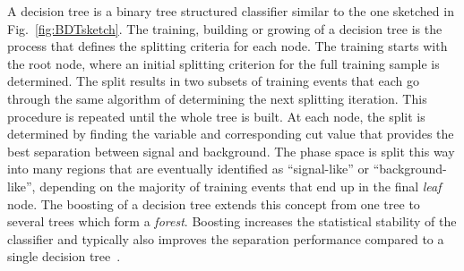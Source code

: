 A decision tree  is a binary tree structured classifier similar to the one sketched in Fig.~\ref{fig:BDTsketch}. 
The training, building or growing of a decision tree is the process that defines the splitting criteria
for each node. The training starts with the root node, where an initial splitting criterion for the
full training sample is determined. The split results in two subsets of training events that each go
through the same algorithm of determining the next splitting iteration. This procedure is repeated
until the whole tree is built. At each node, the split is determined by finding the variable and
corresponding cut value that provides the best separation between signal and background.
The phase space is split this way into many regions that are eventually identified as ``signal-like'' or ``background-like'', depending on the majority of training events that end up in the final \emph{leaf} node. The boosting of a decision tree extends this concept from one tree to several trees which form a \emph{forest}.
Boosting increases the statistical stability of the classifier and typically also improves the separation performance compared to a single decision tree~\cite{QUINLAN1999497}. %


